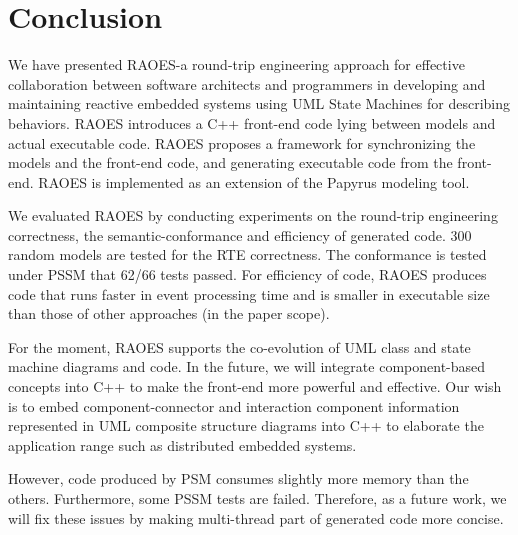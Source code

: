\section{Conclusion}
\label{sec:conclusion}
We have presented RAOES-a round-trip engineering approach for effective collaboration between software architects and programmers in developing and maintaining reactive embedded systems using UML State Machines for describing behaviors. 
RAOES introduces a C++ front-end code lying between models and actual executable code.
RAOES proposes a framework for synchronizing the models and the front-end code, and generating executable code from the front-end.
RAOES is implemented as an extension of the Papyrus modeling tool.

We evaluated RAOES by conducting experiments on the round-trip engineering correctness, the semantic-conformance and efficiency of generated code.
300 random models are tested for the RTE correctness.
The conformance is tested under PSSM that 62/66 tests passed.
For efficiency of code, RAOES produces code that runs faster in event processing time and is smaller in executable size than those of other approaches (in the paper scope).

For the moment, RAOES supports the co-evolution of UML class and state machine diagrams and code.
In the future, we will integrate component-based concepts into C++ to make the front-end more powerful and effective.
Our wish is to embed component-connector and interaction component information represented in UML composite structure diagrams into C++ to elaborate the application range such as distributed embedded systems.

However, code produced by PSM consumes slightly more memory than the others.
Furthermore, some PSSM tests are failed.
Therefore, as a future work, we will fix these issues by making multi-thread part of generated code more concise.  
 